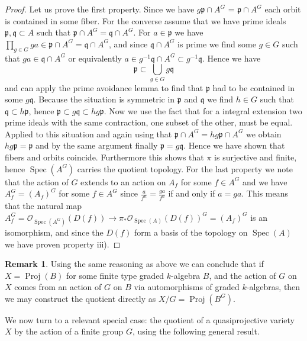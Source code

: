 \documentclass[11pt, a4paper, german, twoside]{article}
\theoremstyle{plain}
\theoremstyle{definition}
\newtheorem{remark}[theorem]{Remark}
\DeclareMathOperator{\Spec}{Spec}
\DeclareMathOperator{\Proj}{Proj}
\begin{document}
\begin{proof}
    Let us prove the first property.
    Since we have $g\mathfrak{p} \cap A^G$ = $\mathfrak{p} \cap A^G$ each orbit is contained in some fiber. For the converse assume that we have
    prime ideals $\mathfrak{p},\mathfrak{q} \subset A$ such that $\mathfrak{p} \cap A^G = \mathfrak{q} \cap A^G$.
    For $a \in \mathfrak{p}$ we have $\prod_{g \in G} ga \in \mathfrak{p} \cap A^G = \mathfrak{q} \cap A^G$, and since $\mathfrak{q} \cap A^G$
    is prime we find some $g \in G$ such that $ga \in \mathfrak{q} \cap A^G$ or equivalently 
    $a \in g^{-1}\mathfrak{q} \cap A^G \subset g^{-1}\mathfrak{q}$. Hence 
    we have 
    \[
        \mathfrak{p} \subset \bigcup_{g \in G} g\mathfrak{q}
    \]
    and can apply the prime avoidance lemma to find that $\mathfrak{p}$ had to be
    contained in some $g\mathfrak{q}$. Because the situation is symmetric in $\mathfrak{p}$ and $\mathfrak{q}$ we find $h \in G$ such that
    $\mathfrak{q} \subset h\mathfrak{p}$, hence $\mathfrak{p} \subset g\mathfrak{q} \subset hg\mathfrak{p}$. Now we use the fact that
    for a integral extension two prime ideals with the same contraction, one subset of the other, must be equal. Applied to this
    situation and again using that $\mathfrak{p} \cap A^G = hg\mathfrak{p} \cap A^G$ we obtain $hg\mathfrak{p} = \mathfrak{p}$ and by the same
    argument finally $\mathfrak{p} = g\mathfrak{q}$. Hence we have shown that fibers and orbits coincide. Furthermore this shows that $\pi$ is
    surjective and finite, hence $\Spec(A^G)$ carries the quotient topology.
    For the last property we note that the action of $G$ extends to an action on $A_f$ for some $f \in A^G$ and we have 
    $A^G_f = (A_f)^G$ for some $f \in A^G$ since $\frac{a}{f^n} = \frac{ga}{f^n}$ if and only if $a = ga$. This means that the natural
    map $A^G_f = \mathcal{O}_{\Spec(A^G)}(D(f)) \to \pi_*\mathcal{O}_{\Spec(A)}(D(f))^G = (A_f)^G$ is an isomorphism, and since the $D(f)$ form
    a basis of the topology on $\Spec(A)$ we have proven property iii).
\end{proof}

\begin{remark}
    Using the same reasoning as above we can conclude that if $X = \Proj(B)$ for some finite type graded $k$-algebra $B$, 
    and the action of $G$ on $X$ comes from
    an action of $G$ on $B$ via automorphisms of graded $k$-algebras, then we may construct the quotient directly as $X/G = \Proj(B^G)$.
\end{remark}

We now turn to a relevant special case: the quotient of a quasiprojective variety $X$ by the action of a finite group $G$, using the following
general result.
\end{document}
